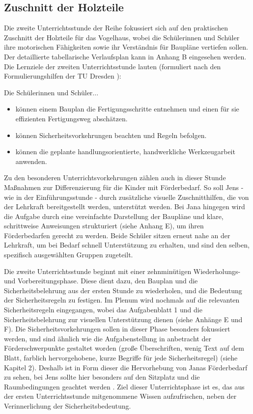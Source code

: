 \documentclass[12pt]{article}
\begin{document}
\subsection{Zuschnitt der Holzteile}
Die zweite Unterrichtsstunde der Reihe fokussiert sich auf den praktischen Zuschnitt der Holzteile für das Vogelhaus, wobei die Schülerinnen und Schüler ihre motorischen Fähigkeiten sowie ihr Verständnis für Baupläne vertiefen sollen. Der detaillierte tabellarische Verlaufsplan kann in Anhang B eingesehen werden. Die Lernziele der zweiten Unterrichtsstunde lauten (formuliert nach den Formulierungshilfen der TU Dresden \autocite[vgl.][]{sachsisches_e-competence_zertifikat_formulierung_2010}): 

Die Schülerinnen und Schüler...
\begin{itemize}
    \item können einem Bauplan die Fertigungsschritte entnehmen und einen für sie effizienten Fertigungsweg abschätzen.
    \item können Sicherheitsvorkehrungen beachten und Regeln befolgen.
    \item können die geplante handlungsorientierte, handwerkliche Werkzeugarbeit anwenden.
\end{itemize}

Zu den besonderen Unterrichtsvorkehrungen zählen auch in dieser Stunde Maßnahmen zur Differenzierung für die Kinder mit Förderbedarf. So soll Jens - wie in der Einführungsstunde - durch zusätzliche visuelle Zuschnitthilfen, die von der Lehrkraft bereitgestellt werden, unterstützt werden. Bei Jana hingegen wird die Aufgabe durch eine vereinfachte Darstellung der Baupläne und klare, schrittweise Anweisungen strukturiert (siehe Anhang E), um ihren Förderbedarfen gerecht zu werden. Beide Schüler sitzen erneut nahe an der Lehrkraft, um bei Bedarf schnell Unterstützung zu erhalten, und sind den selben, spezifisch ausgewählten Gruppen zugeteilt.

Die zweite Unterrichtsstunde beginnt mit einer zehnminütigen Wiederholungs- und Vorbereitungsphase. Diese dient dazu, den Bauplan und die Sicherheitsbelehrung aus der ersten Stunde zu wiederholen, und die Bedeutung der Sicherheitsregeln zu festigen. Im Plenum wird nochmals auf die relevanten Sicherheitsregeln eingegangen, wobei das Aufgabenblatt 1 und die Sicherheitsbelehrung zur visuellen Unterstützung dienen (siehe Anhänge E und F). Die Sicherheitsvorkehrungen sollen in dieser Phase besonders fokussiert werden, und sind ähnlich wie die Aufgabenstellung in anbetracht der Förderschwerpunkte gestaltet worden (große Überschriften, wenig Text auf dem Blatt, farblich hervorgehobene, kurze Begriffe für jede Sicherheitsregel) (siehe Kapitel 2). Deshalb ist in Form dieser die Hervorhebung von Janas Förderbedarf zu sehen, bei Jens sollte hier besonders auf den Sitzplatz und die Raumbedingungen geachtet werden \autocite[vgl.][]{prof_dr_thomas_kaul_forderschwerpunkt_2016}. Ziel dieser Unterrichtsphase ist es, das aus der ersten Unterrichtsstunde mitgenommene Wissen aufzufrischen, neben der Verinnerlichung der Sicherheitsbedeutung.
\end{document}

